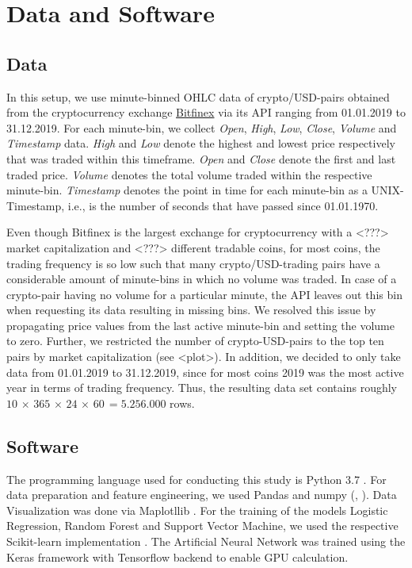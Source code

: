\section{Data and Software}

\subsection{Data}
In this setup, we use minute-binned OHLC data of crypto/USD-pairs obtained from the cryptocurrency 
exchange \href{ https://www.bitfinex.com/ }{Bitfinex} via its API ranging from 01.01.2019 to 31.12.2019.
For each minute-bin, we collect \textit{Open}, \textit{High}, \textit{Low}, \textit{Close}, \textit{Volume} 
and \textit{Timestamp} data. 
\textit{High} and \textit{Low} denote the highest and lowest price respectively
that was traded within this timeframe. 
\textit{Open} and \textit{Close} denote the first and last traded price.
\textit{Volume} denotes the total volume traded within the respective minute-bin.
\textit{Timestamp} denotes the point in time for each minute-bin as a UNIX-Timestamp,
i.e., is the number of seconds that have passed since 01.01.1970.

Even though Bitfinex is the largest exchange for cryptocurrency with a <???> market capitalization and
<???> different tradable coins, for most coins, the trading frequency is so low such that 
many crypto/USD-trading pairs have a considerable amount of minute-bins in which no volume was traded.
In case of a crypto-pair having no volume for a particular minute, the API leaves out this bin
when requesting its data resulting in missing bins. 
We resolved this issue by propagating price values from the last active minute-bin
and setting the volume to zero. Further, we restricted the number of crypto-USD-pairs to the
top ten pairs by market capitalization (see <plot>). 
In addition, we decided to only take data from 01.01.2019 to 31.12.2019, 
since for most coins 2019 was the most active year in terms of trading frequency.
Thus, the resulting data set contains roughly
$ 10\, \times\, 365\, \times\, 24\, \times\, 60\, = 5.256.000 $ rows.

\subsection{Software}
The programming language used for conducting this study is Python 3.7 \cite{python2020}.
For data preparation and feature engineering, we used Pandas and numpy (\cite{pandas2020}, \cite{numpy2020}).
Data Visualization was done via Maplotllib \cite{matplotlib2020}.
For the training of the models Logistic Regression, Random Forest and Support Vector Machine,
we used the respective Scikit-learn implementation \cite{scikit2020}. 
The Artificial Neural Network was trained using the Keras framework with Tensorflow backend to enable
GPU calculation.
